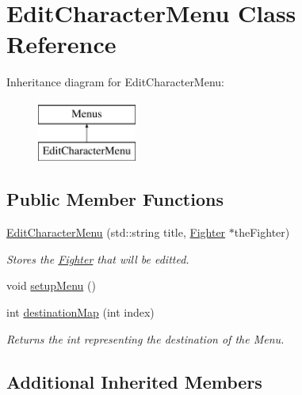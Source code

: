 \hypertarget{class_edit_character_menu}{}\section{Edit\+Character\+Menu Class Reference}
\label{class_edit_character_menu}
Inheritance diagram for Edit\+Character\+Menu\+:\begin{figure}[H]
\begin{center}
\leavevmode
\includegraphics[height=2.000000cm]{class_edit_character_menu}
\end{center}
\end{figure}
\subsection*{Public Member Functions}
\begin{DoxyCompactItemize}
\item 
\hyperlink{class_edit_character_menu_ac5ccf5f076cb527b6a2b37d3354dfbcb}{Edit\+Character\+Menu} (std\+::string title, \hyperlink{class_fighter}{Fighter} $\ast$the\+Fighter)
\begin{DoxyCompactList}\small\item\em Stores the \hyperlink{class_fighter}{Fighter} that will be editted. \end{DoxyCompactList}\item 
void \hyperlink{class_edit_character_menu_a2ea2e7296923486c5c1e83bd5e5e8c11}{setup\+Menu} ()
\item 
\hypertarget{class_edit_character_menu_adfc4060063d68792b56436399891053e}{}\label{class_edit_character_menu_adfc4060063d68792b56436399891053e} 
int \hyperlink{class_edit_character_menu_adfc4060063d68792b56436399891053e}{destination\+Map} (int index)
\begin{DoxyCompactList}\small\item\em Returns the int representing the destination of the Menu. \end{DoxyCompactList}\end{DoxyCompactItemize}
\subsection*{Additional Inherited Members}


